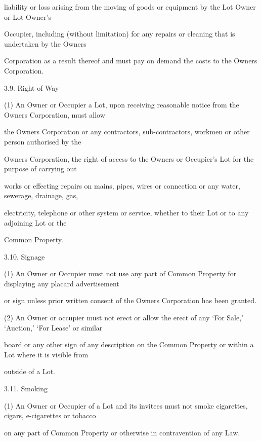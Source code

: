 \documentclass{article}
\begin{document}
{\fontsize{10.02}{1}liability or loss arising from the moving of goods or equipment by the Lot Owner or Lot Owner’s }

{\fontsize{10.02}{1}Occupier, including (without limitation) for any repairs or cleaning that is undertaken by the Owners }

{\fontsize{10.02}{1}Corporation as a result thereof and must pay on demand the costs to the Owners Corporation. }

\newpage

{\fontsize{9.99}{1}3.9. Right of Way }

{\fontsize{9.962}{1}(1) An Owner or Occupier a Lot, upon receiving reasonable notice from the Owners Corporation, must allow }

{\fontsize{10.02}{1}the Owners Corporation or any contractors, sub-contractors, workmen or other person authorised by the }

{\fontsize{10.02}{1}Owners Corporation, the right of access to the Owners or Occupier’s Lot for the purpose of carrying out }

{\fontsize{10.02}{1}works or effecting repairs on mains, pipes, wires or connection or any water, sewerage, drainage, gas, }

{\fontsize{10.02}{1}electricity, telephone or other system or service, whether to their Lot or to any adjoining Lot or the }

{\fontsize{10.02}{1}Common Property. }

{\fontsize{9.99}{1}3.10. Signage }

{\fontsize{9.962}{1}(1) An Owner or Occupier must not use any part of Common Property for displaying any placard advertisement }

{\fontsize{10.02}{1}or sign unless prior written consent of the Owners Corporation has been granted. }

{\fontsize{9.962}{1}(2) An Owner or occupier must not erect or allow the erect of any ‘For Sale,’ ‘Auction,’ ‘For Lease’ or similar }

{\fontsize{10.02}{1}board or any other sign of any description on the Common Property or within a Lot where it is visible from }

{\fontsize{10.02}{1}outside of a Lot. }

{\fontsize{9.99}{1}3.11. Smoking }

{\fontsize{9.962}{1}(1) An Owner or Occupier of a Lot and its invitees must not smoke cigarettes, cigars, e-cigarettes or tobacco }

{\fontsize{10.02}{1}on any part of Common Property or otherwise in contravention of any Law. }
\end{document}

